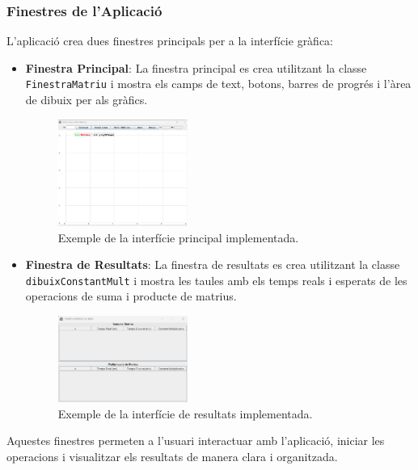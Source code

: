 \documentclass{ieeetj}
\begin{document}
\subsubsection{Finestres de l'Aplicació}
L'aplicació crea dues finestres principals per a la interfície gràfica:

\begin{itemize}
    \item \textbf{Finestra Principal}: La finestra principal es crea utilitzant la classe \texttt{FinestraMatriu} i mostra els camps de text, botons, barres de progrés i l'àrea de dibuix per als gràfics.

\begin{figure}[htbp]
\centerline{\includegraphics[width=0.4\textwidth]{png/grafica.png}}
\caption{Exemple de la interfície principal implementada.}
\label{fig:int1}
\end{figure}

    \item \textbf{Finestra de Resultats}: La finestra de resultats es crea utilitzant la classe \texttt{dibuixConstantMult} i mostra les taules amb els temps reals i esperats de les operacions de suma i producte de matrius.

\begin{figure}[htbp]
\centerline{\includegraphics[width=0.4\textwidth]{png/taulaResultats.png}}
\caption{Exemple de la interfície de resultats implementada.}
\label{fig:int2}
\end{figure}

\end{itemize}

Aquestes finestres permeten a l'usuari interactuar amb l'aplicació, iniciar les operacions i visualitzar els resultats de manera clara i organitzada.
\end{document}
